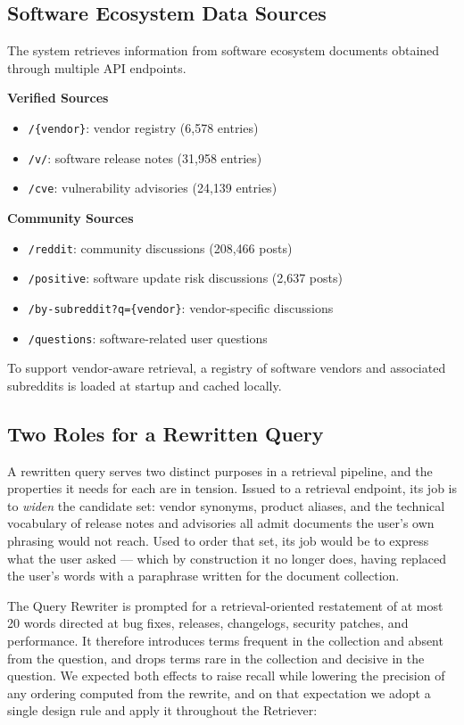 \documentclass[acmsmall,review,anonymous,screen]{acmart}
\begin{document}
\subsection{Software Ecosystem Data Sources}\label{sec:datasources}

The system retrieves information from software ecosystem documents
obtained through multiple API endpoints.

\textbf{Verified Sources}
\begin{itemize}
\item \texttt{/\{vendor\}}: vendor registry (6,578 entries)
\item \texttt{/v/}: software release notes (31,958 entries)
\item \texttt{/cve}: vulnerability advisories (24,139 entries)
\end{itemize}

\textbf{Community Sources}
\begin{itemize}
\item \texttt{/reddit}: community discussions (208,466 posts)
\item \texttt{/positive}: software update risk discussions (2,637 posts)
\item \texttt{/by-subreddit?q=\{vendor\}}: vendor-specific discussions
\item \texttt{/questions}: software-related user questions
\end{itemize}

To support vendor-aware retrieval, a registry of software vendors and
associated subreddits is loaded at startup and cached locally.

\subsection{Two Roles for a Rewritten Query}\label{sec:rewrite-roles}

A rewritten query serves two distinct purposes in a retrieval pipeline,
and the properties it needs for each are in tension. Issued to a
retrieval endpoint, its job is to \emph{widen} the candidate set:
vendor synonyms, product aliases, and the technical vocabulary of
release notes and advisories all admit documents the user's own
phrasing would not reach. Used to order that set, its job would be to
express what the user asked --- which by construction it no longer
does, having replaced the user's words with a paraphrase written for
the document collection.

The Query Rewriter is prompted for a retrieval-oriented restatement of
at most 20 words directed at bug fixes, releases, changelogs, security
patches, and performance. It therefore introduces terms frequent in the
collection and absent from the question, and drops terms rare in the
collection and decisive in the question. We expected both effects to raise
recall while lowering the precision of any ordering computed from the rewrite,
and on that expectation we adopt a single design rule and apply it throughout
the Retriever:
\end{document}
